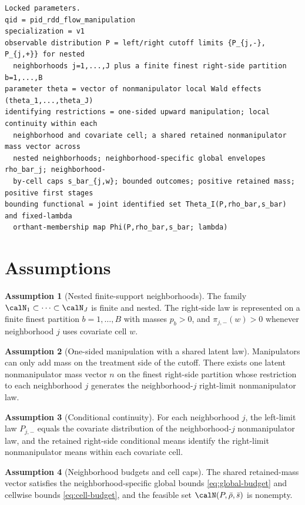 \documentclass[11pt]{article}
\theoremstyle{definition}
\newtheorem{assumption}{Assumption}
\theoremstyle{plain}
\theoremstyle{remark}
\begin{document}
\begin{verbatim}
Locked parameters.
qid = pid_rdd_flow_manipulation
specialization = v1
observable distribution P = left/right cutoff limits {P_{j,-}, P_{j,+}} for nested
  neighborhoods j=1,...,J plus a finite finest right-side partition b=1,...,B
parameter theta = vector of nonmanipulator local Wald effects (theta_1,...,theta_J)
identifying restrictions = one-sided upward manipulation; local continuity within each
  neighborhood and covariate cell; a shared retained nonmanipulator mass vector across
  nested neighborhoods; neighborhood-specific global envelopes rho_bar_j; neighborhood-
  by-cell caps s_bar_{j,w}; bounded outcomes; positive retained mass; positive first stages
bounding functional = joint identified set Theta_I(P,rho_bar,s_bar) and fixed-lambda
  orthant-membership map Phi(P,rho_bar,s_bar; lambda)
\end{verbatim}

\section{Assumptions}
\begin{assumption}[Nested finite-support neighborhoods]\label{ass:nested-support}
The family \(\calN_1\subset\cdots\subset\calN_J\) is finite and nested.  The right-side law is
represented on a finite finest partition \(b=1,\ldots,B\) with masses \(p_b>0\), and
\(\pi_{j,-}(w)>0\) whenever neighborhood \(j\) uses covariate cell \(w\).
\end{assumption}

\begin{assumption}[One-sided manipulation with a shared latent law]\label{ass:shared-law}
Manipulators can only add mass on the treatment side of the cutoff.  There exists one latent
nonmanipulator mass vector \(n\) on the finest right-side partition whose restriction to each
neighborhood \(j\) generates the neighborhood-\(j\) right-limit nonmanipulator law.
\end{assumption}

\begin{assumption}[Conditional continuity]\label{ass:conditional-continuity}
For each neighborhood \(j\), the left-limit law \(P_{j,-}\) equals the covariate distribution
of the neighborhood-\(j\) nonmanipulator law, and the retained right-side conditional means
identify the right-limit nonmanipulator means within each covariate cell.
\end{assumption}

\begin{assumption}[Neighborhood budgets and cell caps]\label{ass:budgets}
The shared retained-mass vector satisfies the neighborhood-specific global bounds
\eqref{eq:global-budget} and cellwise bounds \eqref{eq:cell-budget}, and the feasible set
\(\calN(P,\bar\rho,\bar s)\) is nonempty.
\end{assumption}
\end{document}
